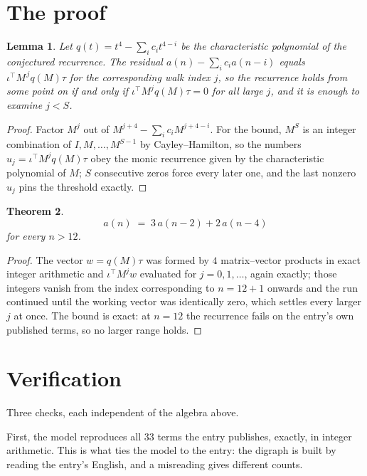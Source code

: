 \documentclass[11pt,a4paper]{article}
\theoremstyle{plain}
\newtheorem{theorem}{Theorem}
\newtheorem{lemma}[theorem]{Lemma}
\theoremstyle{definition}
\begin{document}
\section{The proof}

\begin{lemma}\label{lem:crit}
Let $q(t)=t^{4}-\sum_i c_it^{4-i}$ be the characteristic polynomial of the
conjectured recurrence. The residual $a(n)-\sum_ic_ia(n-i)$ equals
$\iota^{\!\top}M^{\,j}q(M)\tau$ for the corresponding walk index $j$, so the recurrence
holds from some point on if and only if $\iota^{\!\top}M^{j}q(M)\tau=0$ for all large $j$,
and it is enough to examine $j<S$.
\end{lemma}

\begin{proof}
Factor $M^{j}$ out of $M^{j+4}-\sum_ic_iM^{j+4-i}$. For the bound, $M^{S}$
is an integer combination of $I,M,\dots,M^{S-1}$ by Cayley--Hamilton, so the numbers
$u_j=\iota^{\!\top}M^{j}q(M)\tau$ obey the monic recurrence given by the characteristic
polynomial of $M$; $S$ consecutive zeros force every later one, and the last nonzero $u_j$
pins the threshold exactly.
\end{proof}

\begin{theorem}
\[
a(n)\;=\;3\,a(n-2) + 2\,a(n-4)
\]
for every $n>12$.
\end{theorem}

\begin{proof}
The vector $w=q(M)\tau$ was formed by $4$ matrix--vector products in exact integer
arithmetic and $\iota^{\!\top}M^{j}w$ evaluated for $j=0,1,\dots$, again exactly; those
integers vanish from the index corresponding to $n=12+1$ onwards and the run continued
until the working vector was identically zero, which settles every larger $j$ at once. The bound is exact: at $n=12$ the recurrence fails on the entry's own published terms, so no larger range holds.
\end{proof}

\section{Verification}

Three checks, each independent of the algebra above.

First, the model reproduces all $33$ terms the entry publishes, exactly, in integer
arithmetic. This is what ties the model to the entry: the digraph is built by reading the
entry's English, and a misreading gives different counts.
\end{document}
